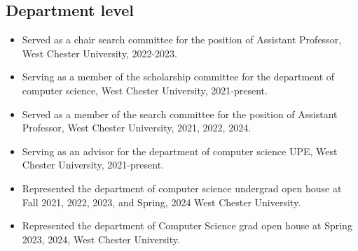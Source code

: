 \documentclass{article}
\begin{document}
\subsection*{Department level}\vspace{-0.5em}
\begin{itemize}
\setlength\itemsep{-0.4em}
    \item Served as a chair search committee for the position of Assistant Professor, West Chester University, 2022-2023.
    \item Serving as a member of the scholarship committee for the department of computer science, West Chester University, 2021-present.
    \item Served as a member of the search committee for the position of Assistant Professor, West Chester University, 2021, 2022, 2024.
    \item Serving as an advisor for the department of computer science UPE, West Chester University, 2021-present.
    \item Represented the department of computer science undergrad open house at Fall 2021, 2022, 2023, and Spring, 2024 West Chester University.
    \item Represented the department of Computer Science grad open house at Spring 2023, 2024, West Chester University.
\end{itemize}
\end{document}
